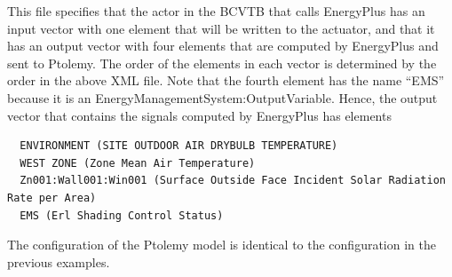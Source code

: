 This file specifies that the actor in the BCVTB that calls EnergyPlus has an input vector with one element that will be written to the actuator, and that it has an output vector with four elements that are computed by EnergyPlus and sent to Ptolemy. The order of the elements in each vector is determined by the order in the above XML file. Note that the fourth element has the name ``EMS'' because it is an EnergyManagementSystem:OutputVariable. Hence, the output vector that contains the signals computed by EnergyPlus has elements

\begin{lstlisting}
  ENVIRONMENT (SITE OUTDOOR AIR DRYBULB TEMPERATURE)
  WEST ZONE (Zone Mean Air Temperature)
  Zn001:Wall001:Win001 (Surface Outside Face Incident Solar Radiation Rate per Area)
  EMS (Erl Shading Control Status)
\end{lstlisting}

The configuration of the Ptolemy model is identical to the configuration in the previous examples.
